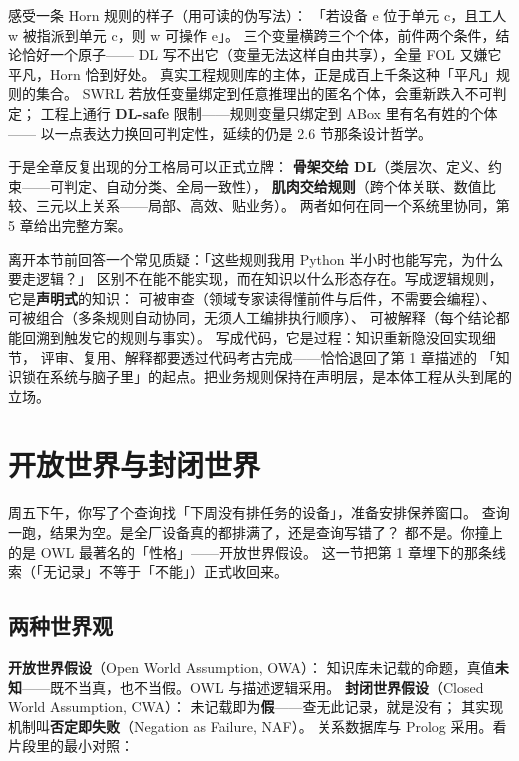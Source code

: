 感受一条 Horn 规则的样子（用可读的伪写法）：
「若设备 e 位于单元 c，且工人 w 被指派到单元 c，则 w 可操作 e」。
三个变量横跨三个个体，前件两个条件，结论恰好一个原子——
DL 写不出它（变量无法这样自由共享），全量 FOL 又嫌它平凡，Horn 恰到好处。
真实工程规则库的主体，正是成百上千条这种「平凡」规则的集合。
SWRL 若放任变量绑定到任意推理出的匿名个体，会重新跌入不可判定；
工程上通行 \textbf{DL-safe} 限制——规则变量只绑定到 ABox 里有名有姓的个体——
以一点表达力换回可判定性，延续的仍是 2.6 节那条设计哲学。

于是全章反复出现的分工格局可以正式立牌：
\textbf{骨架交给 DL}（类层次、定义、约束——可判定、自动分类、全局一致性），
\textbf{肌肉交给规则}（跨个体关联、数值比较、三元以上关系——局部、高效、贴业务）。
两者如何在同一个系统里协同，第 5 章给出完整方案。

离开本节前回答一个常见质疑：「这些规则我用 Python 半小时也能写完，为什么要走逻辑？」
区别不在能不能实现，而在知识以什么形态存在。写成逻辑规则，它是\textbf{声明式}的知识：
可被审查（领域专家读得懂前件与后件，不需要会编程）、
可被组合（多条规则自动协同，无须人工编排执行顺序）、
可被解释（每个结论都能回溯到触发它的规则与事实）。
写成代码，它是过程：知识重新隐没回实现细节，
评审、复用、解释都要透过代码考古完成——恰恰退回了第 1 章描述的
「知识锁在系统与脑子里」的起点。把业务规则保持在声明层，是本体工程从头到尾的立场。

\section{开放世界与封闭世界}

周五下午，你写了个查询找「下周没有排任务的设备」，准备安排保养窗口。
查询一跑，结果为空。是全厂设备真的都排满了，还是查询写错了？
都不是。你撞上的是 OWL 最著名的「性格」——开放世界假设。
这一节把第 1 章埋下的那条线索（「无记录」不等于「不能」）正式收回来。

\subsection{两种世界观}

\textbf{开放世界假设}（Open World Assumption, OWA）：
知识库未记载的命题，真值\textbf{未知}——既不当真，也不当假。OWL 与描述逻辑采用。
\textbf{封闭世界假设}（Closed World Assumption, CWA）：
未记载即为\textbf{假}——查无此记录，就是没有；
其实现机制叫\textbf{否定即失败}（Negation as Failure, NAF）。
关系数据库与 Prolog 采用。看片段里的最小对照：



